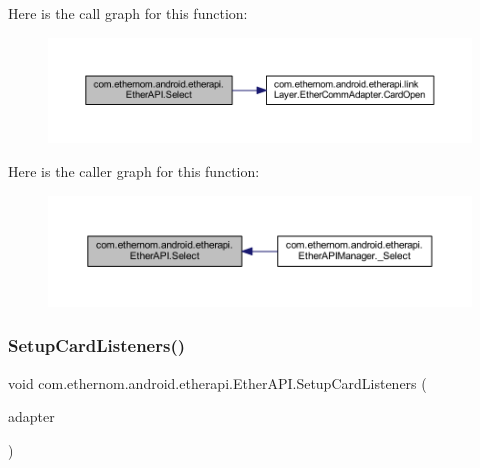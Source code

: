 Here is the call graph for this function\+:\nopagebreak
\begin{figure}[H]
\begin{center}
\leavevmode
\includegraphics[width=350pt]{classcom_1_1ethernom_1_1android_1_1etherapi_1_1_ether_a_p_i_a12e73d4fe631c9817166a1a16ee05949_cgraph}
\end{center}
\end{figure}
Here is the caller graph for this function\+:\nopagebreak
\begin{figure}[H]
\begin{center}
\leavevmode
\includegraphics[width=350pt]{classcom_1_1ethernom_1_1android_1_1etherapi_1_1_ether_a_p_i_a12e73d4fe631c9817166a1a16ee05949_icgraph}
\end{center}
\end{figure}
\mbox{\label{classcom_1_1ethernom_1_1android_1_1etherapi_1_1_ether_a_p_i_a9785ed6dbf7ce2f95bc22f8aa9908392}} 
\subsubsection{\texorpdfstring{Setup\+Card\+Listeners()}{SetupCardListeners()}}
{\footnotesize\ttfamily void com.\+ethernom.\+android.\+etherapi.\+Ether\+A\+P\+I.\+Setup\+Card\+Listeners (\begin{DoxyParamCaption}\item[{\mbox{\hyperlink{classcom_1_1ethernom_1_1android_1_1etherapi_1_1link_layer_1_1_ether_comm_adapter}{Ether\+Comm\+Adapter}}}]{adapter }\end{DoxyParamCaption})}



